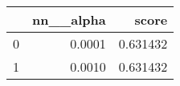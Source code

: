 \begin{tabular}{lrr}
\toprule
{} &  nn\_\_alpha &     score \\
\midrule
0 &     0.0001 &  0.631432 \\
1 &     0.0010 &  0.631432 \\
\bottomrule
\end{tabular}
